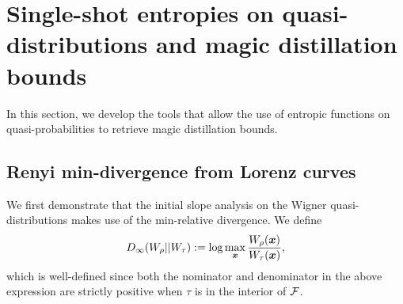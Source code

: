 \documentclass[pra,
aps,
twocolumn,
superscriptaddress,
groupedaddress,
nofootinbib,
reprint
]{revtex4-1}
\begin{document}
\newpage
\section{Single-shot entropies on quasi-distributions and magic distillation bounds}

In this section, we develop the tools that allow the use of entropic functions on quasi-probabilities to retrieve magic distillation bounds.

\subsection{Renyi min-divergence from Lorenz curves}
We first demonstrate that the initial slope analysis on the Wigner quasi-distributions makes use of the min-relative divergence. We define 
\begin{equation}
	D_\infty(W_\rho || W_\tau) := \log  \max_{\boldsymbol{x}} \frac{W_\rho(\boldsymbol{x})}{W_\tau(\boldsymbol{x})},
\end{equation}
which is well-defined since both the nominator and denominator in the above expression are strictly positive when $\tau$ is in the interior of ${\mathcal F}$.
\end{document}
